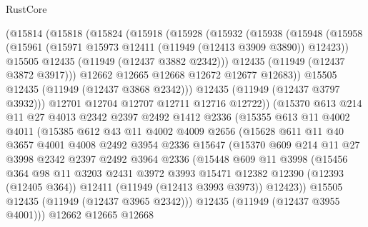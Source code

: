 \begin{lexlean}{RustCore}
\begin{coremodule}
      (@15814
        (@15818
          (@15824
            (@15918
              (@15928
                (@15932
                  (@15938
                    (@15948
                      (@15958
                        (@15961 (@15971 @15973 @12411 (@11949 (@12413 @3909 @3890)) @12423))
                        @15505
                        @12435
                        (@11949 (@12437 @3882 @2342)))
                      @12435
                      (@11949 (@12437 @3872 @3917)))
                    @12662
                    @12665
                    @12668
                    @12672
                    @12677
                    @12683))
                @15505
                @12435
                (@11949 (@12437 @3868 @2342)))
              @12435
              (@11949 (@12437 @3797 @3932)))
            @12701
            @12704
            @12707
            @12711
            @12716
            @12722))
        (@15370
          @613
          @214
          @11
          @27
          @4013
          @2342
          @2397
          @2492
          @1412
          @2336
          (@15355
            @613
            @11
            @4002
            @4011
            (@15385
              @612
              @43
              @11
              @4002
              @4009
              @2656
              (@15628
                @611
                @11
                @40
                @3657
                @4001
                @4008
                @2492
                @3954
                @2336
                @15647
                (@15370
                  @609
                  @214
                  @11
                  @27
                  @3998
                  @2342
                  @2397
                  @2492
                  @3964
                  @2336
                  (@15448
                    @609
                    @11
                    @3998
                    (@15456
                      @364
                      @98
                      @11
                      @3203
                      @2431
                      @3972
                      @3993
                      @15471
                      @12382
                      @12390
                      (@12393 (@12405 @364))
                      @12411
                      (@11949 (@12413 @3993 @3973))
                      @12423))
                  @15505
                  @12435
                  (@11949 (@12437 @3965 @2342)))
                @12435
                (@11949 (@12437 @3955 @4001)))
              @12662
              @12665
              @12668

\end{coremodule}
\end{lexlean}
